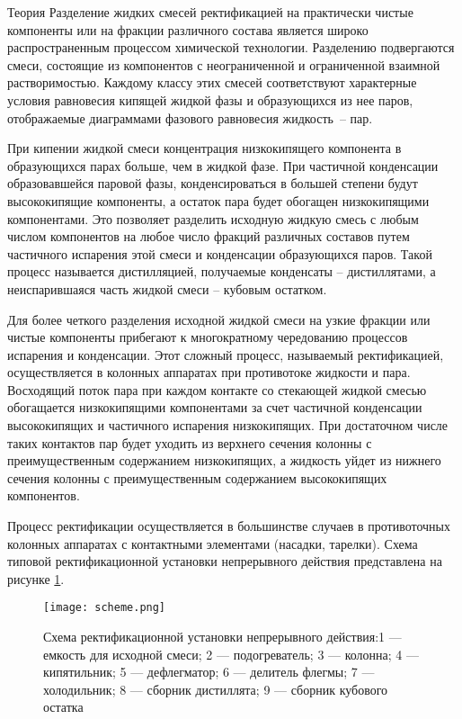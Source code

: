 

Теория
Разделение жидких смесей ректификацией на практически чистые компоненты или на фракции различного состава является широко распространенным процессом химической технологии. Разделению подвергаются смеси, состоящие из компонентов с неограниченной и ограниченной взаимной растворимостью. Каждому классу этих смесей соответствуют характерные условия равновесия кипящей жидкой фазы и образующихся из нее паров, отображаемые диаграммами фазового равновесия жидкость~-- пар.

При кипении жидкой смеси концентрация низкокипящего компонента в образующихся парах больше, чем в жидкой фазе. При частичной конденсации образовавшейся паровой фазы, конденсироваться в большей степени будут высококипящие компоненты, а остаток пара будет обогащен низкокипящими компонентами. Это позволяет разделить исходную жидкую смесь с любым числом компонентов на любое число фракций различных составов путем частичного испарения этой смеси и конденсации образующихся паров. Такой процесс называется дистилляцией, получаемые конденсаты – дистиллятами, а неиспарившаяся часть жидкой смеси – кубовым остатком. 

Для более четкого разделения исходной жидкой смеси на узкие фракции или чистые компоненты прибегают к многократному чередованию процессов испарения и конденсации. Этот сложный процесс, называемый ректификацией, осуществляется в колонных аппаратах при противотоке жидкости и пара. Восходящий поток пара при каждом контакте со стекающей жидкой смесью обогащается низкокипящими компонентами за счет частичной конденсации высококипящих и частичного испарения низкокипящих. При достаточном числе таких контактов пар будет уходить из верхнего сечения колонны с преимущественным содержанием низкокипящих, а жидкость уйдет из нижнего сечения колонны с преимущественным содержанием высококипящих компонентов.

Процесс ректификации осуществляется в большинстве случаев в противоточных колонных аппаратах с контактными элементами (насадки, тарелки). Схема типовой ректификационной установки непрерывного действия представлена на рисунке \ref{fig:rect.scheme}.

\begin{figure}[h]
	\begin{center}
		\texttt{[image: scheme.png]}
	\end{center}
	\caption{Схема ректификационной установки непрерывного действия:1 --- емкость для исходной смеси; 2 --- подогреватель; 3 --- колонна; 4 --- кипятильник; 5 --- дефлегматор; 6 --- делитель флегмы; 7 --- холодильник; 8 --- сборник дистиллята; 9 --- сборник кубового остатка} \label{fig:rect.scheme}
\end{figure}


